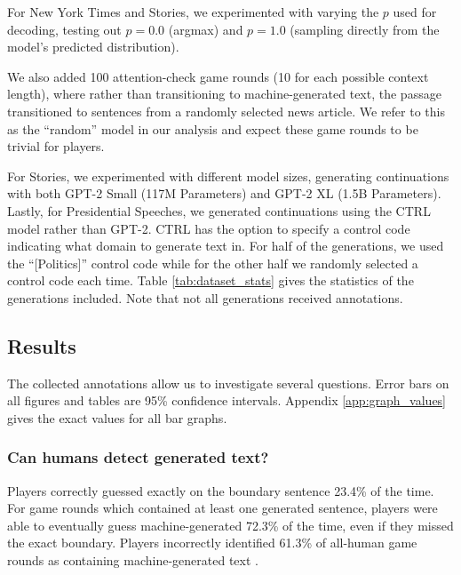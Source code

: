 For New York Times and Stories, we experimented with varying the $p$ used for decoding, testing out $p=0.0$ (argmax) and $p=1.0$ (sampling directly from the model's predicted distribution).

We also added 100 attention-check game rounds (10 for each possible context length), where rather than transitioning to machine-generated text, the passage transitioned to sentences from a randomly selected news article.
We refer to this as the ``random'' model in our analysis and expect these game rounds to be trivial for players.

For Stories, we experimented with different model sizes, generating continuations with both GPT-2 Small (117M Parameters) and GPT-2 XL (1.5B Parameters).
Lastly, for Presidential Speeches, we generated continuations using the CTRL model \citep{keskar2019ctrl} rather than GPT-2.
CTRL has the option to specify a control code indicating what domain to generate text in. For half of the generations, we used the ``[Politics]'' control code while for the other half we randomly selected a control code each time.
Table \ref{tab:dataset_stats} gives the statistics of the generations included. Note that not all generations received annotations.




\subsection{Results}
\label{section:roft_results}
The collected annotations allow us to investigate several questions.
Error bars on all figures and tables are 95\% confidence intervals.
Appendix \ref{app:graph_values} gives the exact values for all bar graphs.

\subsubsection{Can humans detect generated text?}
Players correctly guessed exactly on the boundary sentence 23.4\% of the time.
For game rounds which contained at least one generated sentence, players were able to eventually guess machine-generated 72.3\% of the time, even if they missed the exact boundary. %
Players incorrectly identified 61.3\% of all-human game rounds as containing machine-generated text .

